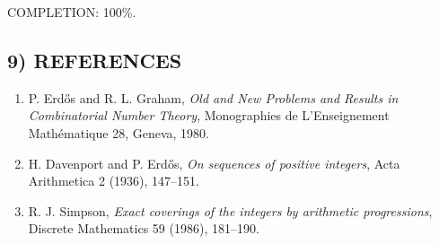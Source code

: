 COMPLETION: 100\%.

\subsection*{9) REFERENCES}

\begin{enumerate}
\item P. Erd\H{o}s and R. L. Graham, \emph{Old and New Problems and Results in Combinatorial Number Theory}, Monographies de L'Enseignement Math\'ematique 28, Geneva, 1980.
\item H. Davenport and P. Erd\H{o}s, \emph{On sequences of positive integers}, Acta Arithmetica 2 (1936), 147--151.
\item R. J. Simpson, \emph{Exact coverings of the integers by arithmetic progressions}, Discrete Mathematics 59 (1986), 181--190.
\end{enumerate}
